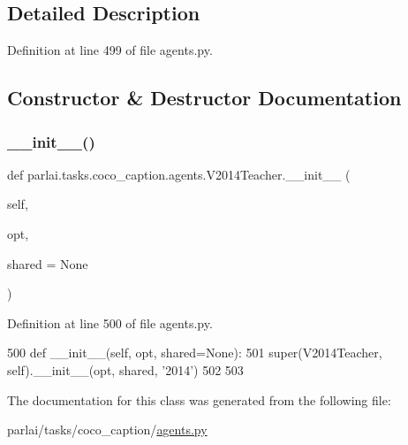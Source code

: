 \subsection{Detailed Description}


Definition at line 499 of file agents.\+py.



\subsection{Constructor \& Destructor Documentation}
\mbox{\label{classparlai_1_1tasks_1_1coco__caption_1_1agents_1_1V2014Teacher_a270de04c549341bc63faf54b5f448108}} 
\subsubsection{\texorpdfstring{\+\_\+\+\_\+init\+\_\+\+\_\+()}{\_\_init\_\_()}}
{\footnotesize\ttfamily def parlai.\+tasks.\+coco\+\_\+caption.\+agents.\+V2014\+Teacher.\+\_\+\+\_\+init\+\_\+\+\_\+ (\begin{DoxyParamCaption}\item[{}]{self,  }\item[{}]{opt,  }\item[{}]{shared = {\ttfamily None} }\end{DoxyParamCaption})}



Definition at line 500 of file agents.\+py.


\begin{DoxyCode}
500     \textcolor{keyword}{def }\_\_init\_\_(self, opt, shared=None):
501         super(V2014Teacher, self).\_\_init\_\_(opt, shared, \textcolor{stringliteral}{'2014'})
502 
503 
\end{DoxyCode}


The documentation for this class was generated from the following file\+:\begin{DoxyCompactItemize}
\item 
parlai/tasks/coco\+\_\+caption/\hyperlink{parlai_2tasks_2coco__caption_2agents_8py}{agents.\+py}\end{DoxyCompactItemize}
